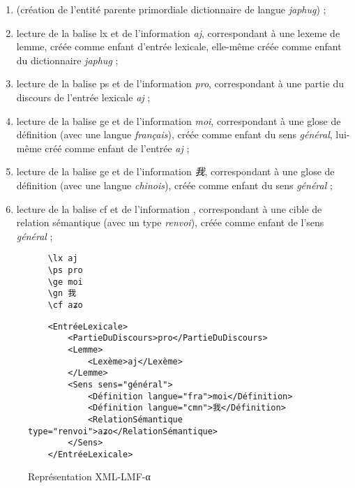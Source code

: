 \documentclass[10pt]{report}
\newcommand{\balise}[1]{\textcolor{red!80}{#1}}
\newcommand{\entité}[1]{\textcolor{blue!80!black}{#1}}
\newcommand{\caractéristique}[1]{\textcolor{green!60!black}{#1}}
\begin{document}
\begin{enumerate}
	\item (création de l’entité parente primordiale \entité{dictionnaire} de \caractéristique{langue} \textit{japhug}) ;
	\item lecture de la balise \balise{lx} et de l’information \textit{aj}, correspondant à une \caractéristique{lexeme} de \entité{lemme}, créée comme enfant d’\entité{entrée lexicale}, elle-même créée comme enfant du \entité{dictionnaire} \textit{japhug} ;
	\item lecture de la balise \balise{ps} et de l’information \textit{pro}, correspondant à une \caractéristique{partie du discours} de l’\entité{entrée lexicale} \textit{aj} ;
	\item lecture de la balise \balise{ge} et de l’information \textit{moi}, correspondant à une \caractéristique{glose} de \entité{définition} (avec une \caractéristique{langue} \textit{français}), créée comme enfant du \entité{sens} \textit{général}, lui-même créé comme enfant de l’\entité{entrée} \textit{aj} ;
	\item lecture de la balise \balise{ge} et de l’information \textit{我}, correspondant à une \caractéristique{glose} de \entité{définition} (avec une \caractéristique{langue} \textit{chinois}), créée comme enfant du \entité{sens} \textit{général} ;
	\item lecture de la balise \balise{cf} et de l’information \textit{}, correspondant à une \caractéristique{cible} de \entité{relation sémantique} (avec un \caractéristique{type} \textit{renvoi}), créée comme enfant de l’\entité{sens} \textit{général} ;
\end{enumerate}

\begin{figure}[H]
	\centering
	\begin{minipage}{0.2\linewidth}
    \begin{verbatim}
    \lx aj
    \ps pro
    \ge moi
    \gn 我
    \cf aʑo
    \end{verbatim}
	\end{minipage}%
	\begin{minipage}{0.8\linewidth}
    \begin{verbatim}
    <EntréeLexicale>
        <PartieDuDiscours>pro</PartieDuDiscours>
        <Lemme>
            <Lexème>aj</Lexème>
        </Lemme>
        <Sens sens="général">
            <Définition langue="fra">moi</Définition>
            <Définition langue="cmn">我</Définition>
            <RelationSémantique type="renvoi">aʑo</RelationSémantique>
        </Sens>	
    </EntréeLexicale>
    \end{verbatim}	
	\end{minipage} 
	\caption{Représentation XML-LMF-α}
	\label{rep-xml-lmf-α}
\end{figure}
\end{document}
